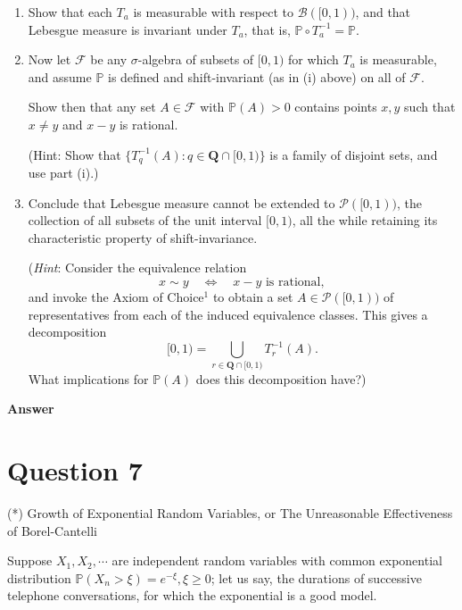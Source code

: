\documentclass[letterpaper]{article}
\begin{document}
		\begin{enumerate}
			\item[(i)] Show that each $T_a$ is measurable with respect to $\mathcal{B}([0,1))$, and that Lebesgue measure is invariant under $T_a$, that is, $\mathbb{P} \circ T_a^{-1} = \mathbb{P}$.
			
			\item[(ii)] Now let $\mathcal{F}$ be any $\sigma$-algebra of subsets of $[0,1)$ for which $T_a$ is measurable, and assume $\mathbb{P}$ is defined and shift-invariant (as in (i) above) on all of $\mathcal{F}$.
			
			Show then that any set $A \in \mathcal{F}$ with $\mathbb{P}(A) > 0$ contains points $x, y$ such that $x \neq y$ and $x - y$ is rational.
			
			(Hint: Show that $\{T_q^{-1}(A) : q \in \mathbf{Q} \cap [0,1)\}$ is a family of disjoint sets, and use part (i).)
			
			\item[(iii)] Conclude that Lebesgue measure cannot be extended to $\mathcal{P}([0,1))$, the collection of all subsets of the unit interval $[0,1)$, all the while retaining its characteristic property of shift-invariance.
			
			(\emph{Hint}: Consider the equivalence relation
			\[
			x \sim y \quad \Longleftrightarrow \quad x - y \text{ is rational},
			\]
			and invoke the Axiom of Choice${}^1$ to obtain a set $A \in \mathcal{P}([0,1))$ of representatives from each of the induced equivalence classes. This gives a decomposition
			\[
			[0,1) = \bigcup_{r \in \mathbf{Q} \cap [0,1)} T_r^{-1}(A).
			\]
			What implications for $\mathbb{P}(A)$ does this decomposition have?)
		\end{enumerate}
		
		\textbf{Answer}
		
		\clearpage
		
		\section{Question 7}
		
		{\color{deepred} (*) Growth of Exponential Random Variables, or The Unreasonable Effectiveness of Borel-Cantelli}
		
		 Suppose $X_{1}, X_{2}, \cdots$ are independent random variables with common exponential distribution $\mathbb{P}\left(X_{n}>\xi\right)=e^{-\xi}, \xi \geq 0$; let us say, the durations of successive telephone conversations, for which the exponential is a good model.
		
\end{document}
